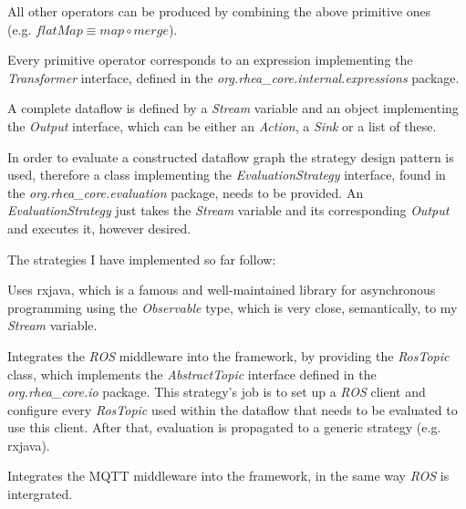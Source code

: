 \documentclass{dithesis}
\begin{document}
All other operators can be produced by combining the above primitive ones \\
(e.g. $flatMap \equiv map \circ merge$).


Every primitive operator corresponds to an expression implementing the \textit{Transformer} interface, defined in the \textit{org.rhea\_core.internal.expressions} package. 

A complete dataflow is defined by a \textit{Stream} variable and an object implementing the \textit{Output} interface, which can be either an \textit{Action}, a \textit{Sink} or a list of these. 

In order to evaluate a constructed dataflow graph the strategy design pattern is used, therefore a class implementing the \textit{EvaluationStrategy} interface, found in the \textit{org.rhea\_core.evaluation} package, needs to be provided. An \textit{EvaluationStrategy} just takes the \textit{Stream} variable and its corresponding \textit{Output} and executes it, however desired.

The strategies I have implemented so far follow:

\begin{description}[style=nextline]
\item[RxJavaEvaluationStrategy\site{https://github.com/rhea-flow/rx-eval}] 
Uses rxjava, which is a famous and well-maintained library for asynchronous programming using the \textit{Observable} type, which is very close, semantically, to my \textit{Stream} variable.

\item[RosEvaluationStrategy\site{https://github.com/rhea-flow/ros-eval}] 
Integrates the \textit{ROS} middleware into the framework, by providing the \textit{RosTopic} class, which implements the \textit{AbstractTopic} interface defined in the \textit{org.rhea\_core.io} package. This strategy's job is to set up a \textit{ROS} client and configure every \textit{RosTopic} used within the dataflow that needs to be evaluated to use this client. After that, evaluation is propagated to a generic strategy (e.g. rxjava).

\item[MqttEvaluationStrategy\site{https://github.com/rhea-flow/mqtt-eval}] 
Integrates the MQTT middleware into the framework, in the same way \textit{ROS} is intergrated.
\end{description}
\end{document}

